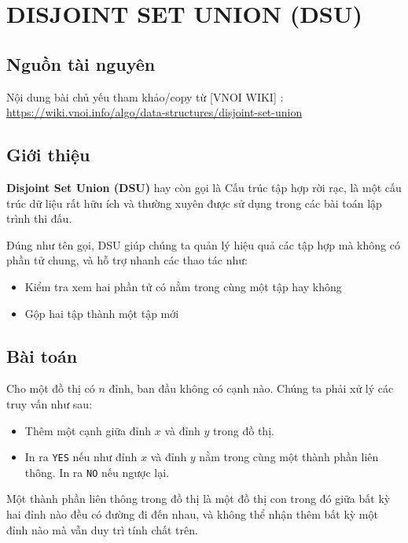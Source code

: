 \chapter{DISJOINT SET UNION (DSU)}

\minitoc

\section{Nguồn tài nguyên}

Nội dung bài chủ yếu tham khảo/copy từ [VNOI WIKI] : \url{https://wiki.vnoi.info/algo/data-structures/disjoint-set-union}

\section{Giới thiệu}

\textbf{Disjoint Set Union (DSU)} hay còn gọi là Cấu trúc tập hợp rời rạc, là một cấu trúc dữ liệu rất hữu ích và thường xuyên được sử dụng trong các bài toán lập trình thi đấu.

Đúng như tên gọi, DSU giúp chúng ta quản lý hiệu quả các tập hợp mà không có phần tử chung, và hỗ trợ nhanh các thao tác như:
\begin{itemize}
    \item Kiểm tra xem hai phần tử có nằm trong cùng một tập hay không
    \item Gộp hai tập thành một tập mới
\end{itemize}

\section{Bài toán}

Cho một đồ thị có $n$ đỉnh, ban đầu không có cạnh nào. Chúng ta phải xử lý các truy vấn như sau:

\begin{itemize}
    \item Thêm một cạnh giữa đỉnh $x$ và đỉnh $y$ trong đồ thị.
    \item In ra \texttt{YES} nếu như đỉnh $x$ và đỉnh $y$ nằm trong cùng một thành phần liên thông. In ra \texttt{NO} nếu ngược lại.
\end{itemize}

Một thành phần liên thông trong đồ thị là một đồ thị con trong đó giữa bất kỳ hai đỉnh nào đều có đường đi đến nhau, và không thể nhận thêm bất kỳ một đỉnh nào mà vẫn duy trì tính chất trên.

